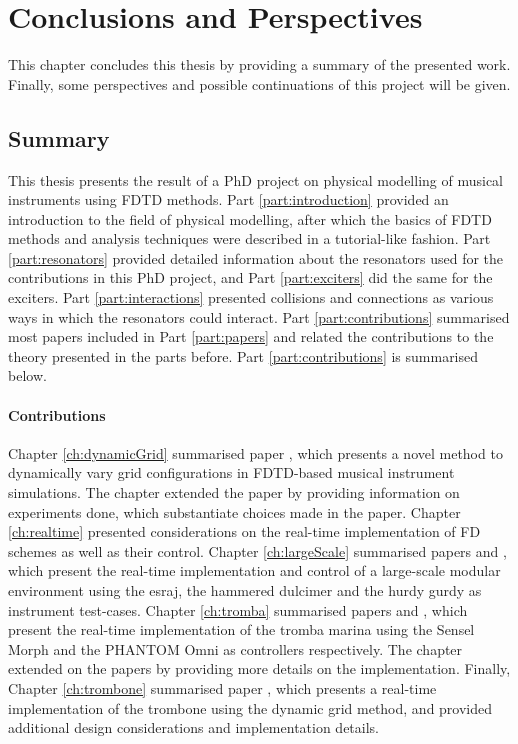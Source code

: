 \chapter{Conclusions and Perspectives}\label{ch:conclusion}
This chapter concludes this thesis by providing a summary of the presented work. Finally, some perspectives and possible continuations of this project will be given.

\section{Summary}
This thesis presents the result of a PhD project on physical modelling of musical instruments using FDTD methods.
Part \ref{part:introduction} provided an introduction to the field of physical modelling, after which the basics of FDTD methods and analysis techniques were described in a tutorial-like fashion. Part \ref{part:resonators} provided detailed information about the resonators used for the contributions in this PhD project, and Part \ref{part:exciters} did the same for the exciters. Part \ref{part:interactions} presented collisions and connections as various ways in which the resonators could interact. Part \ref{part:contributions} summarised most papers included in Part \ref{part:papers} and related the contributions to the theory presented in the parts before. Part \ref{part:contributions} is summarised below.
\subsubsection{Contributions}
Chapter \ref{ch:dynamicGrid} summarised paper \citeP[G], which presents a novel method to dynamically vary grid configurations in FDTD-based musical instrument simulations. The chapter extended the paper by providing information on experiments done, which substantiate choices made in the paper. 
Chapter \ref{ch:realtime} presented considerations on the real-time implementation of FD schemes as well as their control. 
Chapter \ref{ch:largeScale} summarised papers \citeP[A] and \citeP[B], which present the real-time implementation and control of a large-scale modular environment using the esraj, the hammered dulcimer and the hurdy gurdy as instrument test-cases. 
Chapter \ref{ch:tromba} summarised papers \citeP[D] and \citeP[E], which present the real-time implementation of the tromba marina using the Sensel Morph and the PHANTOM Omni as controllers respectively. The chapter extended on the papers by providing more details on the implementation. Finally, Chapter \ref{ch:trombone} summarised paper \citeP[H], which presents a real-time implementation of the trombone using the dynamic grid method, and provided additional design considerations and implementation details.

